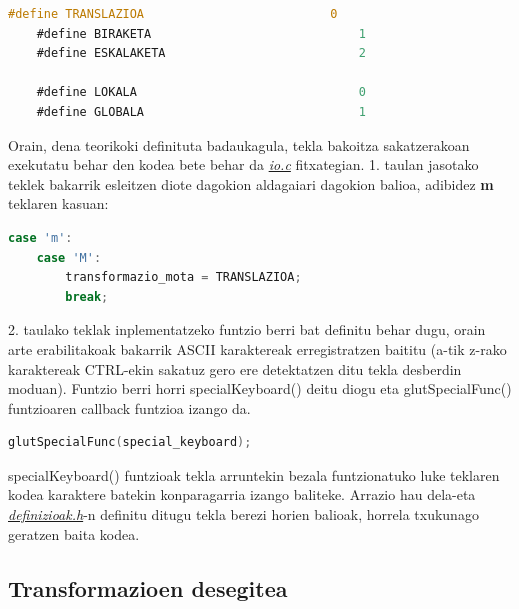\documentclass[12pt]{article}
\newcommand{\fitxategi}[1] {\underline{\textit{#1}}}
\newcommand{\tekla}[1] {\textbf{#1}}
\begin{document}
\begin{center}
	\begin{lstlisting}[language=C, basicstyle=\footnotesize]
	#define TRANSLAZIOA                          0
	#define BIRAKETA                             1
	#define ESKALAKETA                           2
	
	#define LOKALA                               0
	#define GLOBALA                              1
	\end{lstlisting}
\end{center}


Orain, dena teorikoki definituta badaukagula, tekla bakoitza sakatzerakoan exekutatu behar den kodea bete behar da \fitxategi{io.c} fitxategian. 1. taulan jasotako teklek bakarrik esleitzen diote dagokion aldagaiari dagokion balioa, adibidez \tekla{m} teklaren kasuan:

\begin{center}
	\begin{lstlisting}[language=C, basicstyle=\footnotesize]
	case 'm':
	case 'M':
		transformazio_mota = TRANSLAZIOA;
		break;
	\end{lstlisting}
\end{center}


2. taulako teklak inplementatzeko funtzio berri bat definitu behar dugu, orain arte erabilitakoak bakarrik ASCII karaktereak erregistratzen baititu (a-tik z-rako karaktereak CTRL-ekin sakatuz gero ere detektatzen ditu tekla desberdin moduan).
Funtzio berri horri specialKeyboard() deitu diogu eta glutSpecialFunc()\cite{glutSpecialFunc} funtzioaren callback funtzioa\cite{callback} izango da.

\begin{center}
	\begin{lstlisting}[language=C, basicstyle=\footnotesize]
	glutSpecialFunc(special_keyboard);
	\end{lstlisting}
\end{center}

specialKeyboard() funtzioak tekla arruntekin bezala funtzionatuko luke teklaren kodea karaktere batekin konparagarria izango baliteke. Arrazio hau dela-eta \fitxategi{definizioak.h}-n definitu ditugu tekla berezi horien balioak, horrela txukunago geratzen baita kodea.




\subsection{Transformazioen desegitea}\label{procedure}
\end{document}
